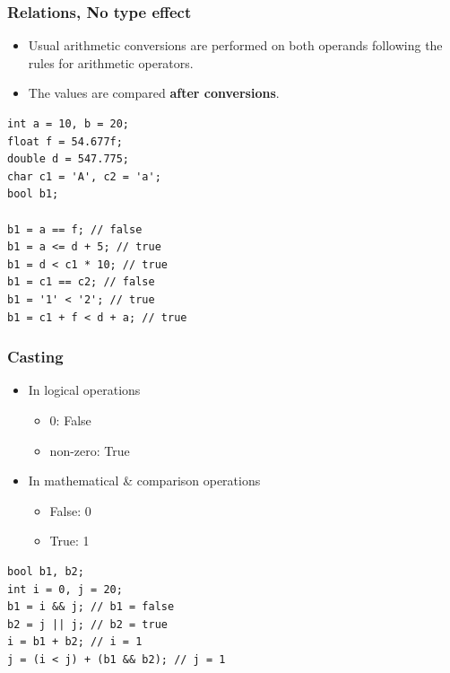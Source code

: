 \documentclass{../c-lecture}
\begin{document}
\begin{frame}[fragile]
  \frametitle{Relations, No type effect}
  \begin{itemize}
    \item Usual arithmetic conversions are performed on both operands following the
      rules for arithmetic operators.
    \item The values are compared \textbf{\color{Orange} after conversions}.
  \end{itemize}
  \begin{verbatim}
int a = 10, b = 20;
float f = 54.677f;
double d = 547.775;
char c1 = 'A', c2 = 'a';
bool b1;

b1 = a == f; // false
b1 = a <= d + 5; // true
b1 = d < c1 * 10; // true
b1 = c1 == c2; // false
b1 = '1' < '2'; // true
b1 = c1 + f < d + a; // true
  \end{verbatim}
\end{frame}

\begin{frame}[fragile]
  \frametitle{Casting}
  \begin{itemize}
    \item In logical operations
    \begin{itemize}
      \item 0: False
      \item non-zero: True
    \end{itemize}
    \item In mathematical \& comparison operations
    \begin{itemize}
      \item False: 0
      \item True: 1
    \end{itemize}
  \end{itemize}
  \begin{verbatim}
bool b1, b2;
int i = 0, j = 20;
b1 = i && j; // b1 = false
b2 = j || j; // b2 = true
i = b1 + b2; // i = 1
j = (i < j) + (b1 && b2); // j = 1
  \end{verbatim}
\end{frame}
\end{document}
